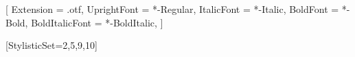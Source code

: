 

\usepackage{fontspec}

\setmainfont{EBGaramond}[
  Extension      = .otf,
  UprightFont    = *-Regular,
  ItalicFont     = *-Italic,
  BoldFont       = *-Bold,
  BoldItalicFont = *-BoldItalic,
]


[StylisticSet={2,5,9,10}]


\usepackage{graphicx}
\usepackage{siunitx}
\usepackage{tikz}
\usepackage{booktabs}
\usepackage{algorithm}
\usepackage{algpseudocode}
{}

\usepackage[backend=biber,
  style=authoryear,
  giveninits=true,
  uniquename=init
]{biblatex}



